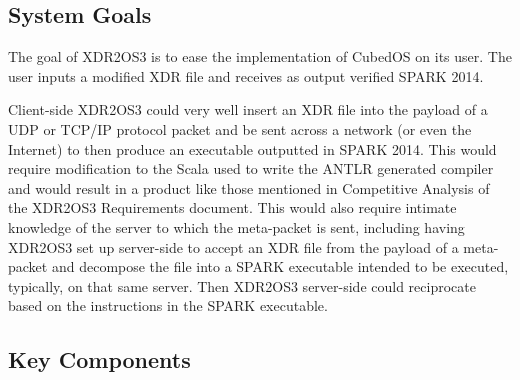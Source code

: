 \subsection{System Goals}

The goal of XDR2OS3 is to ease the implementation of CubedOS on its user. The user inputs a
modified XDR file and receives as output verified SPARK 2014.

Client-side XDR2OS3 could very well insert an XDR file into the payload of a UDP or TCP/IP
protocol packet and be sent across a network (or even the Internet) to then produce an
executable outputted in SPARK 2014. This would require modification to the Scala used to write
the ANTLR generated compiler and would result in a product like those mentioned in Competitive
Analysis of the XDR2OS3 Requirements document. This would also require intimate knowledge of the
server to which the meta-packet is sent, including having XDR2OS3 set up server-side to accept
an XDR file from the payload of a meta-packet and decompose the file into a SPARK executable
intended to be executed, typically, on that same server. Then XDR2OS3 server-side could
reciprocate based on the instructions in the SPARK executable.

\subsection{Key Components}

